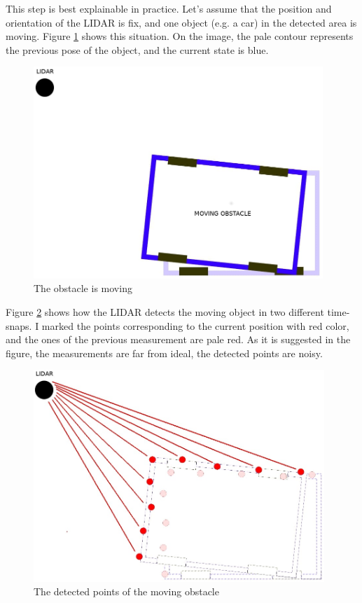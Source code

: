 This step is best explainable in practice. Let's assume that the position and orientation of the LIDAR is fix, and one object (e.g. a car) in the detected area is moving. Figure \ref{obstacle_movement} shows this situation. On the image, the pale contour represents the previous pose of the object, and the current state is blue.

\begin{figure}[!ht]
    \centering
    \includegraphics[height=80mm]{figures/raw/jpeg/obstacle_movement.jpg}
    \caption{The obstacle is moving}
    \label{obstacle_movement}
\end{figure}

Figure \ref{obstacle_movement_lidar} shows how the LIDAR detects the moving object in two different time-snaps. I marked the points corresponding to the current position with red color, and the ones of the previous measurement are pale red. As it is suggested in the figure, the measurements are far from ideal, the detected points are noisy.

\begin{figure}[!ht]
    \centering
    \includegraphics[height=80mm]{figures/raw/jpeg/obstacle_movement_lidar.jpg}
    \caption{The detected points of the moving obstacle}
    \label{obstacle_movement_lidar}
\end{figure}

